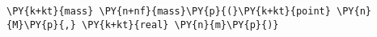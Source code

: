 \begin{Verbatim}[commandchars=\\\{\}]
    \PY{k+kt}{mass} \PY{n+nf}{mass}\PY{p}{(}\PY{k+kt}{point} \PY{n}{M}\PY{p}{,} \PY{k+kt}{real} \PY{n}{m}\PY{p}{)}
\end{Verbatim}
